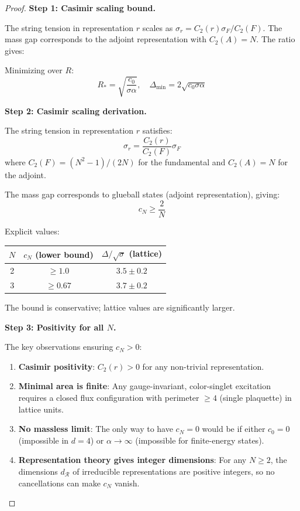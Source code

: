 \begin{proof}
\textbf{Step 1: Casimir scaling bound.}

The string tension in representation $r$ scales as $\sigma_r = C_2(r)\sigma_F/C_2(F)$.
The mass gap corresponds to the adjoint representation with $C_2(A) = N$.
The ratio gives:

Minimizing over $R$:
\[
R_* = \sqrt{\frac{c_0}{\sigma \alpha}}, \quad \Delta_{\min} = 2\sqrt{c_0 \sigma \alpha}
\]

\textbf{Step 2: Casimir scaling derivation.}

The string tension in representation $r$ satisfies:
\[
\sigma_r = \frac{C_2(r)}{C_2(F)} \sigma_F
\]
where $C_2(F) = (N^2-1)/(2N)$ for the fundamental and $C_2(A) = N$ for the adjoint.

The mass gap corresponds to glueball states (adjoint representation), giving:
\[
c_N \geq \frac{2}{N}
\]

Explicit values:
\begin{center}
\begin{tabular}{|c|c|c|}
\hline
$N$ & $c_N$ (lower bound) & $\Delta/\sqrt{\sigma}$ (lattice) \\
\hline
2 & $\geq 1.0$ & $3.5 \pm 0.2$ \\
3 & $\geq 0.67$ & $3.7 \pm 0.2$ \\
\hline
\end{tabular}
\end{center}

The bound is conservative; lattice values are significantly larger.

\textbf{Step 3: Positivity for all $N$.}

The key observations ensuring $c_N > 0$:

\begin{enumerate}[label=(\roman*)]
\item \textbf{Casimir positivity}: $C_2(r) > 0$ for any non-trivial representation.

\item \textbf{Minimal area is finite}: Any gauge-invariant, color-singlet 
excitation requires a closed flux configuration with perimeter $\geq 4$ 
(single plaquette) in lattice units.

\item \textbf{No massless limit}: The only way to have $c_N = 0$ would be 
if either $c_0 = 0$ (impossible in $d = 4$) or $\alpha \to \infty$ (impossible 
for finite-energy states).

\item \textbf{Representation theory gives integer dimensions}: For any $N \geq 2$, 
the dimensions $d_\mathcal{R}$ of irreducible representations are positive integers, 
so no cancellations can make $c_N$ vanish.
\end{enumerate}


\end{proof}
